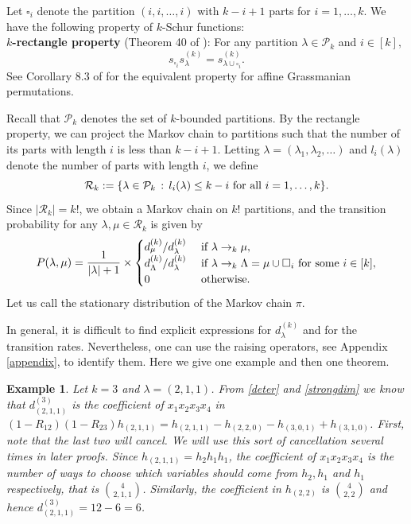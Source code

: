 \documentclass[11pt]{amsart}
\newtheorem{example}[theorem]{Example}
\newcommand{\tn}[1]{\textnormal{#1}}
\begin{document}
Let $\square_i$ denote the partition $(i,i,\ldots,i)$ with $k-i+1$ parts for $i=1,\ldots,k.$ We have the following property of $k$-Schur functions: \\
\noindent \textbf{$k$-rectangle property} (Theorem 40 of \cite{LM07}): For any partition $\lambda \in \mathcal{P}_k$ and $i \in [k],$
\[s_{\square_i} s^{(k)}_{\lambda} = s^{(k)}_{\lambda \cup \square_i}. \]
See Corollary 8.3 of \cite{L08} for the equivalent property for affine Grassmanian permutations.

Recall that $\mathcal{P}_k$ denotes the set of $k$-bounded partitions. By the rectangle property, we can project the Markov chain to partitions such that the number of its parts with length $i$ is less than $k-i+1.$ Letting $\lambda=(\lambda_1,\lambda_2,\ldots)$ and $l_i(\lambda)$ denote the number of parts with length $i$, we define 
\[\mathcal{R}_k:=\{\lambda \in \mathcal{P}_k \, : \, l_i(\lambda)\leq k-i \tn{ for all } i=1,\ldots,k\}. \]
Since $|\mathcal{R}_k|=k!$, we obtain a Markov chain on $k!$ partitions, and the transition probability for any $\lambda,\mu \in \mathcal{R}_k$ is given by 
\[P(\lambda,\mu)= \frac{1}{ |\lambda|+1} \times \begin{cases}
  d_{\mu}^{(k)} \slash d_{\lambda}^{(k)} & \tn{ if  }\lambda \rightarrow_k \mu, \\
    d_{\Lambda}^{(k)} \slash d_{\lambda}^{(k)} & \tn{ if  }\lambda \rightarrow_k \Lambda = \mu \cup \square_i \tn{ for some }i \in [k],\\
    0  & \tn{ otherwise}.
\end{cases}\]
Let us call the stationary distribution of the Markov chain $\pi$. 

In general, it is difficult to find explicit expressions for $d_\lambda^{(k)}$ and for the transition rates. Nevertheless, one can use the raising operators, see Appendix \ref{appendix}, to identify them. Here we give one example and then one theorem.
\begin{example} \label{ex:dim}
 Let $k=3$ and $\lambda=(2,1,1)$. From \eqref{deter} and \eqref{strongdim} we know that $d_{(2,1,1)}^{(3)}$ is the 
 coefficient of $x_1x_2x_3x_4$ in $(1-R_{12})(1-R_{23})h_{(2,1,1)}=h_{(2,1,1)}-h_{(2,2,0)}-h_{(3,0,1)}+h_{(3,1,0)}$. First, note that the last two will cancel. We will use this sort of cancellation several times in later proofs. Since $h_{(2,1,1)}=h_2h_1h_1$, the coefficient of $x_1x_2x_3x_4$ is the number of ways to choose which variables should come from $h_2, h_1$ and $h_1$ respectively, that is $\binom{4}{2,1,1}$. Similarly, the coefficient in 
 $h_{(2,2)}$ is $\binom{4}{2,2}$ and hence $d_{(2,1,1)}^{(3)}=12-6=6$.
\end{example}
\end{document}
